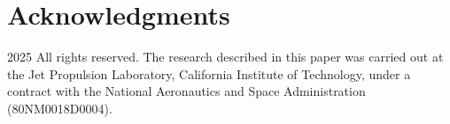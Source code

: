 \section*{Acknowledgments}
{\textcopyright}2025 All rights reserved. The research described in this paper was carried out at the Jet Propulsion Laboratory, California Institute of Technology, under a contract with the National Aeronautics and Space Administration (80NM0018D0004).